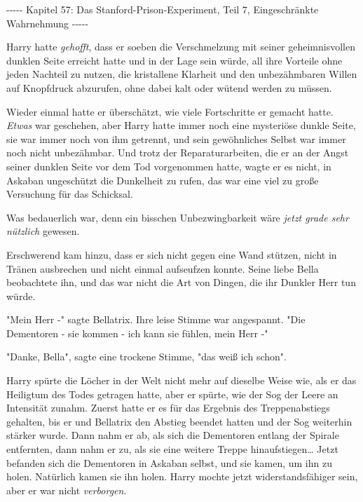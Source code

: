 

\hypertarget{das-stanford-prison-experiment-teil-7-eingeschruxe4nkte-wahrnehmung}{%

-\/-\/-\/-\/- Kapitel 57: Das Stanford-Prison-Experiment, Teil 7, Eingeschränkte Wahrnehmung -\/-\/-\/-\/-

Harry hatte \emph{gehofft}, dass er soeben die Verschmelzung mit seiner geheimnisvollen dunklen Seite erreicht hatte und in der Lage sein würde, all ihre Vorteile ohne jeden Nachteil zu nutzen, die kristallene Klarheit und den unbezähmbaren Willen auf Knopfdruck abzurufen, ohne dabei kalt oder wütend werden zu müssen.

Wieder einmal hatte er überschätzt, wie viele Fortschritte er gemacht hatte. \emph{Etwas} war geschehen, aber Harry hatte immer noch eine mysteriöse dunkle Seite, sie war immer noch von ihm getrennt, und sein gewöhnliches Selbst war immer noch nicht unbezähmbar. Und trotz der Reparaturarbeiten, die er an der Angst seiner dunklen Seite vor dem Tod vorgenommen hatte, wagte er es nicht, in Askaban ungeschützt die Dunkelheit zu rufen, das war eine viel zu große Versuchung für das Schicksal.

Was bedauerlich war, denn ein bisschen Unbezwingbarkeit wäre \emph{jetzt grade sehr nützlich} gewesen.

Erschwerend kam hinzu, dass er sich nicht gegen eine Wand stützen, nicht in Tränen ausbrechen und nicht einmal aufseufzen konnte. Seine liebe Bella beobachtete ihn, und das war nicht die Art von Dingen, die ihr Dunkler Herr tun würde.

"Mein Herr -" sagte Bellatrix. Ihre leise Stimme war angespannt. "Die Dementoren - sie kommen - ich kann sie fühlen, mein Herr -"

"Danke, Bella", sagte eine trockene Stimme, "das weiß ich schon".

Harry spürte die Löcher in der Welt nicht mehr auf dieselbe Weise wie, als er das Heiligtum des Todes getragen hatte, aber er spürte, wie der Sog der Leere an Intensität zunahm. Zuerst hatte er es für das Ergebnis des Treppenabstiegs gehalten, bis er und Bellatrix den Abstieg beendet hatten und der Sog weiterhin stärker wurde. Dann nahm er ab, als sich die Dementoren entlang der Spirale entfernten, dann nahm er zu, als sie eine weitere Treppe hinaufstiegen… Jetzt befanden sich die Dementoren in Askaban selbst, und sie kamen, um ihn zu holen. Natürlich kamen sie ihn holen. Harry mochte jetzt widerstandsfähiger sein, aber er war nicht \emph{verborgen}.

}
